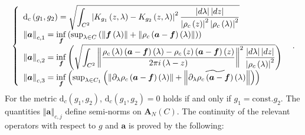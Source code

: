 \documentclass[a4paper]{article}%
\begin{document}
\begin{equation}
\left\{
\begin{array}
[c]{l}%
\mathrm{d}_{c}\left(  g_{1},g_{2}\right)  =\sqrt{%
{\displaystyle\int_{C^{2}}}
\left\vert K_{g_{1}}\left(  z,\lambda\right)  -K_{g_{2}}\left(  z,\lambda
\right)  \right\vert ^{2}\dfrac{\left\vert d\lambda\right\vert \left\vert
dz\right\vert }{\left\vert \rho_{c}\left(  z\right)  \right\vert
^{2}\left\vert \rho_{c}\left(  \lambda\right)  \right\vert ^{2}}}\\
\left\Vert \boldsymbol{a}\right\Vert _{c,1}=\inf\limits_{\boldsymbol{f}%
}\left(  \sup_{\lambda\in C}\left(  \left\Vert \boldsymbol{f}\left(
\lambda\right)  \right\Vert +\left\Vert \rho_{c}\left(  \boldsymbol{a}%
-\boldsymbol{f}\right)  \left(  \lambda\right)  \right\Vert \right)  \right)
\text{ }\\
\left\Vert \boldsymbol{a}\right\Vert _{c,2}=\inf\limits_{\boldsymbol{f}%
}\left(  \sqrt{%
{\displaystyle\int_{C^{2}}}
\left\Vert \dfrac{\rho_{c}\left(  \lambda\right)  \left(  \boldsymbol{a}%
-\boldsymbol{f}\right)  \left(  \lambda\right)  -\rho_{c}\left(  z\right)
\left(  \boldsymbol{a}-\boldsymbol{f}\right)  \left(  z\right)  }{2\pi
i\left(  \lambda-z\right)  }\right\Vert ^{2}\dfrac{\left\vert d\lambda
\right\vert \left\vert dz\right\vert }{\left\vert \rho_{c}\left(
\lambda\right)  \right\vert ^{2}}}\right)  \text{ }\\
\left\Vert \boldsymbol{a}\right\Vert _{c,3}=\inf\limits_{\boldsymbol{f}%
}\left(  \sup_{\lambda\in C_{1}}\left(  \left\Vert \partial_{\lambda}\rho
_{c}\left(  \boldsymbol{a}-\boldsymbol{f}\right)  \left(  \lambda\right)
\right\Vert +\left\Vert \partial_{\lambda}\widetilde{\rho_{c}\left(
\boldsymbol{a}-\boldsymbol{f}\right)  }\left(  \lambda\right)  \right\Vert
\right)  \right)
\end{array}
\right.  \text{.} \label{2-11}%
\end{equation}
For the metric $\mathrm{d}_{c}\left(  g_{1},g_{2}\right)  $, $\mathrm{d}%
_{c}\left(  g_{1},g_{2}\right)  =0$ holds if and only if $g_{1}%
=\mathrm{const.}g_{2}$. The quantities $\left\Vert \boldsymbol{a}\right\Vert
_{c,j}$ define semi-norms on $\boldsymbol{A}_{N}\left(  C\right)  $. The
continuity of the relevant operators with respect to $g$ and $\boldsymbol{a}$
is proved by the following:
\end{document}
